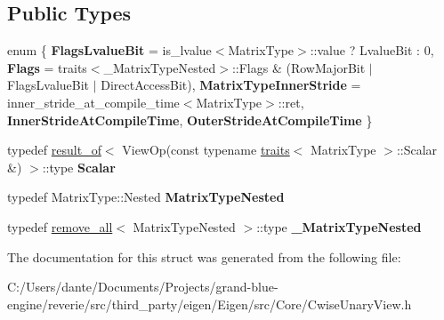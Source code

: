 \subsection*{Public Types}
\begin{DoxyCompactItemize}
\item 
\mbox{\label{struct_eigen_1_1internal_1_1traits_3_01_cwise_unary_view_3_01_view_op_00_01_matrix_type_01_4_01_4_a1ebb3e062ef6f8b1e01916bbc2459ae4}} 
enum \{ \newline
{\bfseries Flags\+Lvalue\+Bit} = is\+\_\+lvalue$<$Matrix\+Type$>$\+::value ? Lvalue\+Bit \+: 0, 
{\bfseries Flags} = traits$<$\+\_\+\+Matrix\+Type\+Nested$>$\+::Flags \& (Row\+Major\+Bit $\vert$ Flags\+Lvalue\+Bit $\vert$ Direct\+Access\+Bit), 
{\bfseries Matrix\+Type\+Inner\+Stride} = inner\+\_\+stride\+\_\+at\+\_\+compile\+\_\+time$<$Matrix\+Type$>$\+::ret, 
{\bfseries Inner\+Stride\+At\+Compile\+Time}, 
\newline
{\bfseries Outer\+Stride\+At\+Compile\+Time}
 \}
\item 
\mbox{\label{struct_eigen_1_1internal_1_1traits_3_01_cwise_unary_view_3_01_view_op_00_01_matrix_type_01_4_01_4_ae388eca20138f05948bdcc57b1cf4af7}} 
typedef \mbox{\hyperlink{struct_eigen_1_1internal_1_1result__of}{result\+\_\+of}}$<$ View\+Op(const typename \mbox{\hyperlink{struct_eigen_1_1internal_1_1traits}{traits}}$<$ Matrix\+Type $>$\+::Scalar \&) $>$\+::type {\bfseries Scalar}
\item 
\mbox{\label{struct_eigen_1_1internal_1_1traits_3_01_cwise_unary_view_3_01_view_op_00_01_matrix_type_01_4_01_4_abea5f8e7606b96895780857b0b6106e3}} 
typedef Matrix\+Type\+::\+Nested {\bfseries Matrix\+Type\+Nested}
\item 
\mbox{\label{struct_eigen_1_1internal_1_1traits_3_01_cwise_unary_view_3_01_view_op_00_01_matrix_type_01_4_01_4_af439e90a224f9a012a2cc6ee5182929e}} 
typedef \mbox{\hyperlink{struct_eigen_1_1internal_1_1remove__all}{remove\+\_\+all}}$<$ Matrix\+Type\+Nested $>$\+::type {\bfseries \+\_\+\+Matrix\+Type\+Nested}
\end{DoxyCompactItemize}


The documentation for this struct was generated from the following file\+:\begin{DoxyCompactItemize}
\item 
C\+:/\+Users/dante/\+Documents/\+Projects/grand-\/blue-\/engine/reverie/src/third\+\_\+party/eigen/\+Eigen/src/\+Core/Cwise\+Unary\+View.\+h\end{DoxyCompactItemize}
